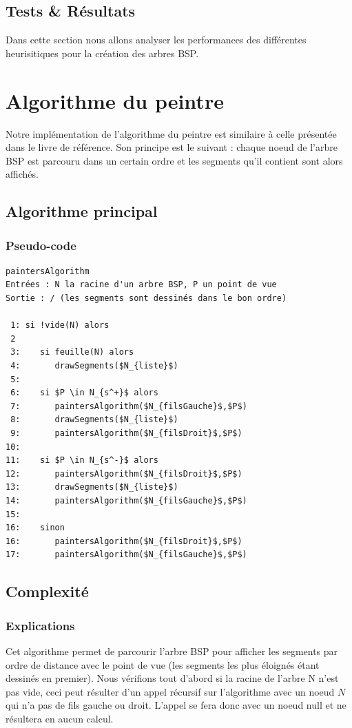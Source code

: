 \documentclass[11pt,a4paper]{article}
\begin{document}
\subsection{Tests \& Résultats}

Dans cette section nous allons analyser les performances des différentes heurisitiques pour la création des arbres BSP. \\

\section{Algorithme du peintre}

Notre implémentation de l'algorithme du peintre est similaire à celle présentée dans le livre de référence. Son principe est le suivant : chaque noeud de l'arbre BSP est parcouru dans un certain ordre et les segments qu'il contient sont alors affichés.

\subsection{Algorithme principal}
\subsubsection{Pseudo-code}
\begin{lstlisting}
paintersAlgorithm
Entrées : N la racine d'un arbre BSP, P un point de vue
Sortie : / (les segments sont dessinés dans le bon ordre)

 1: si !vide(N) alors
 2
 3:    si feuille(N) alors
 4:       drawSegments($N_{liste}$)
 5:
 6:    si $P \in N_{s^+}$ alors
 7:       paintersAlgorithm($N_{filsGauche}$,$P$)
 8:       drawSegments($N_{liste}$)
 9:       paintersAlgorithm($N_{filsDroit}$,$P$)
10:
11:    si $P \in N_{s^-}$ alors
12:       paintersAlgorithm($N_{filsDroit}$,$P$)
13:       drawSegments($N_{liste}$)
14:       paintersAlgorithm($N_{filsGauche}$,$P$)
15:
16:    sinon
16:       paintersAlgorithm($N_{filsDroit}$,$P$)
17:       paintersAlgorithm($N_{filsGauche}$,$P$)
\end{lstlisting}

\subsection{Complexité}

\subsubsection{Explications}
Cet algorithme permet de parcourir l'arbre BSP pour afficher les segments par ordre de distance avec le point de vue (les segments les plus éloignés étant dessinés en premier).
Nous vérifions tout d'abord si la racine de l'arbre N n'est pas vide, ceci peut résulter d'un appel récursif sur l'algorithme avec un noeud $N$ qui n'a pas de fils gauche ou droit. L'appel se fera donc avec un noeud null et ne résultera en aucun calcul.
\end{document}
